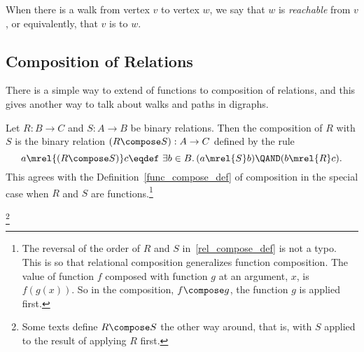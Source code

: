 \begin{definition}
When there is a walk from vertex $v$ to vertex $w$, we say that $w$ is
\emph{reachable} from $v$, or equivalently, that $v$ is
 to $w$.
\end{definition}

\subsection{Composition of Relations}\label{relation_compose_subsec}
There is a simple way to extend  
of functions to composition of relations, and this gives another way to talk about
walks and paths in digraphs.

\begin{definition}
Let $R: B\to C$ and $S: A \to B$ be binary relations.  Then the
composition of $R$ with $S$ is the binary relation $(R \compose
S): A\to C$ defined by the rule
\begin{equation}\label{rel_compose_def}
a \mrel{(R \compose S)} c \eqdef\ \exists b \in B.\, (a \mrel{S} b)
\QAND (b \mrel{R} c).
\end{equation}
This agrees with the Definition~\ref{func_compose_def} of composition
in the special case when $R$ and $S$ are functions.\footnote{The
  reversal of the order of $R$ and $S$ in~\eqref{rel_compose_def} is
  not a typo.  This is so that relational composition generalizes
  function composition.  The value of function $f$ composed with
  function $g$ at an argument, $x$, is $f(g(x))$.  So in the
  composition, $f \compose g$, the function $g$ is applied first.}
\end{definition}

\begin{editingnotes}

\footnote{Some texts define $R \compose S$ the other way around, that
  is, with $S$ applied to the result of applying $R$ first.}

\end{editingnotes}

